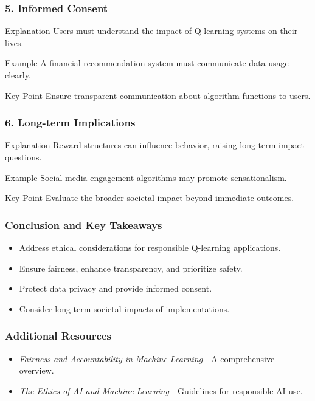\documentclass{beamer}
\begin{document}
\begin{frame}[fragile]
    \frametitle{5. Informed Consent}
    \begin{block}{Explanation}
        Users must understand the impact of Q-learning systems on their lives.
    \end{block}
    \begin{block}{Example}
        A financial recommendation system must communicate data usage clearly.
    \end{block}
    \begin{block}{Key Point}
        Ensure transparent communication about algorithm functions to users.
    \end{block}
\end{frame}

\begin{frame}[fragile]
    \frametitle{6. Long-term Implications}
    \begin{block}{Explanation}
        Reward structures can influence behavior, raising long-term impact questions.
    \end{block}
    \begin{block}{Example}
        Social media engagement algorithms may promote sensationalism.
    \end{block}
    \begin{block}{Key Point}
        Evaluate the broader societal impact beyond immediate outcomes.
    \end{block}
\end{frame}

\begin{frame}
    \frametitle{Conclusion and Key Takeaways}
    \begin{itemize}
        \item Address ethical considerations for responsible Q-learning applications.
        \item Ensure fairness, enhance transparency, and prioritize safety.
        \item Protect data privacy and provide informed consent.
        \item Consider long-term societal impacts of implementations.
    \end{itemize}
\end{frame}

\begin{frame}[fragile]
    \frametitle{Additional Resources}
    \begin{itemize}
        \item \textit{Fairness and Accountability in Machine Learning} - A comprehensive overview.
        \item \textit{The Ethics of AI and Machine Learning} - Guidelines for responsible AI use.
    \end{itemize}
\end{frame}
\end{document}

